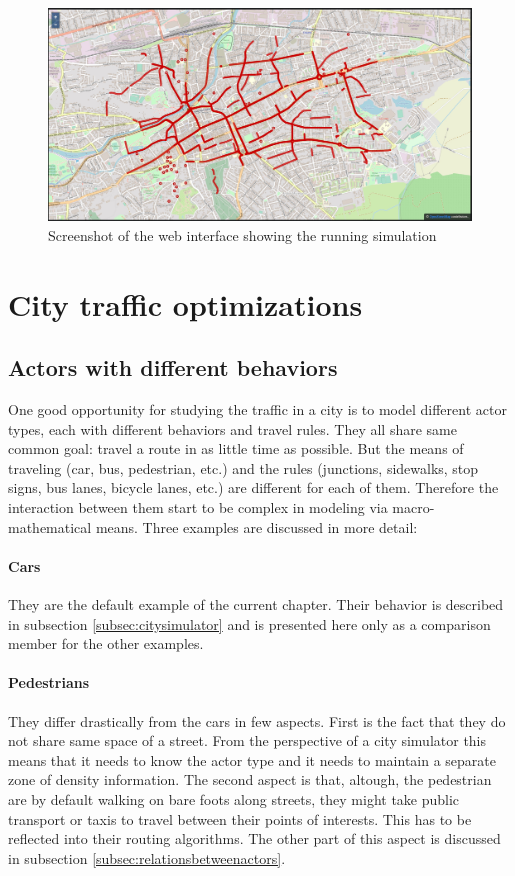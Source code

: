 \documentclass[a4paper,12pt,twoside]{book}
\begin{document}
\begin{figure}
    \includegraphics[width=0.9\linewidth]{ScreenshotWebInterface2.jpg}
    \centering
    \caption{Screenshot of the web interface showing the running simulation}
    \label{fig:ScreenshotWebInterface2}
  \end{figure}

\section{City traffic optimizations}
\label{sec:citytrafficoptimizations}

\subsection{Actors with different behaviors}
\label{subsec:actordiffbehaviors}

One good opportunity for studying the traffic in a city is to model different actor types, each with different behaviors and travel rules. They all share same common goal: travel a route in as little time as possible. But the means of traveling (car, bus, pedestrian, etc.) and the rules (junctions, sidewalks, stop signs, bus lanes, bicycle lanes, etc.) are different for each of them. Therefore the interaction between them start to be complex in modeling via macro-mathematical means. Three examples are discussed in more detail:

\paragraph{Cars} They are the default example of the current chapter. Their behavior is described in subsection \ref{subsec:citysimulator} and is presented here only as a comparison member for the other examples.
\paragraph{Pedestrians} \label{par:pedestrians} They differ drastically from the cars in few aspects. First is the fact that they do not share same space of a street. From the perspective of a city simulator this means that it needs to know the actor type and it needs to maintain a separate zone of density information. The second aspect is that, altough, the pedestrian are by default walking on bare foots along streets, they might take public transport or taxis to travel between their points of interests. This has to be reflected into their routing algorithms. The other part of this aspect is discussed in subsection \ref{subsec:relationsbetweenactors}.
\end{document}
